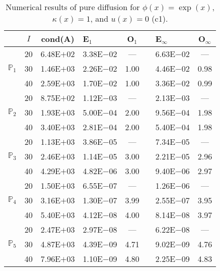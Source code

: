 \begin{table}[H]
\centering
\caption{Numerical results of pure diffusion for $\phi(x)=\exp(x)$, $\kappa(x)=1$, and $u(x)=0$ (c1).}
\begin{tabular}{@{}l c c l c c l c@{}}
\toprule
 & $I$ & cond(A) & E$_1$ & O$_1$ && E$_{\infty}$ & O$_{\infty}$\\
\midrule
\multirow{3}{*}{$\mathbb{P}_{1}$}
 & 20 & 6.48E$+$02 & 3.38E$-$02 & --- && 6.63E$-$02 & ---\\
 & 30 & 1.46E$+$03 & 2.26E$-$02 & 1.00 && 4.46E$-$02 & 0.98\\
 & 40 & 2.59E$+$03 & 1.70E$-$02 & 1.00 && 3.36E$-$02 & 0.99\\
\midrule
\multirow{3}{*}{$\mathbb{P}_{2}$}
 & 20 & 8.75E$+$02 & 1.12E$-$03 & --- && 2.13E$-$03 & ---\\
 & 30 & 1.93E$+$03 & 5.00E$-$04 & 2.00 && 9.56E$-$04 & 1.98\\
 & 40 & 3.40E$+$03 & 2.81E$-$04 & 2.00 && 5.40E$-$04 & 1.98\\
\midrule
\multirow{3}{*}{$\mathbb{P}_{3}$}
 & 20 & 1.13E$+$03 & 3.86E$-$05 & --- && 7.34E$-$05 & ---\\
 & 30 & 2.46E$+$03 & 1.14E$-$05 & 3.00 && 2.21E$-$05 & 2.96\\
 & 40 & 4.29E$+$03 & 4.82E$-$06 & 3.00 && 9.40E$-$06 & 2.97\\
\midrule
\multirow{3}{*}{$\mathbb{P}_{4}$}
 & 20 & 1.50E$+$03 & 6.55E$-$07 & --- && 1.26E$-$06 & ---\\
 & 30 & 3.16E$+$03 & 1.30E$-$07 & 3.99 && 2.55E$-$07 & 3.95\\
 & 40 & 5.40E$+$03 & 4.12E$-$08 & 4.00 && 8.14E$-$08 & 3.97\\
\midrule
\multirow{3}{*}{$\mathbb{P}_{5}$}
 & 20 & 2.47E$+$03 & 2.97E$-$08 & --- && 6.22E$-$08 & ---\\
 & 30 & 4.87E$+$03 & 4.39E$-$09 & 4.71 && 9.02E$-$09 & 4.76\\
 & 40 & 7.96E$+$03 & 1.10E$-$09 & 4.80 && 2.25E$-$09 & 4.83\\
\bottomrule
\end{tabular}
\end{table}